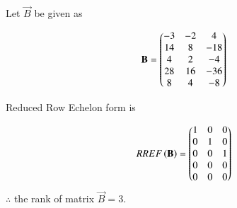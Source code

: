 \documentclass[journal,12pt,twocolumn]{IEEEtran}
\begin{document}
	
	Let $\vec{B}$ be given as
	
	\begin{align} \label{eq3}
		\mathbf{B} = \begin{pmatrix}-3&-2&4 \\ 14&8&-18 \\ 4&2&-4 \\ 28&16&-36 \\ 8&4&-8\end{pmatrix}
	\end{align}
	
	Reduced Row Echelon form is
	
	\begin{align}
		RREF\left(\mathbf{B}\right) = \begin{pmatrix}1&0&0 \\ 0&1&0 \\ 0&0&1 \\ 0&0&0 \\ 0&0&0\end{pmatrix}
	\end{align}
	$\therefore$ the rank of matrix $\vec{B} = 3$.
	
\end{document}
